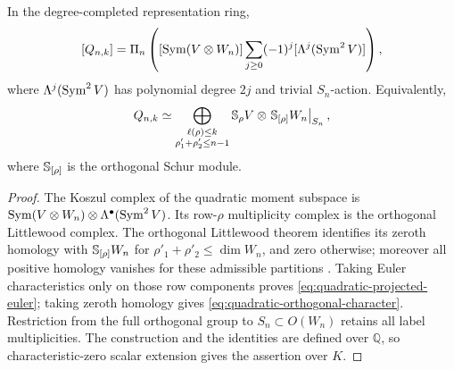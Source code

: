 \begin{theorem}
\label{thm:quadratic-character-all-ranks}
In the degree-completed representation ring,
\begin{equation}\label{eq:quadratic-projected-euler}
 [Q_{n,k}]=\Pi_n\left(
  [\operatorname{Sym}(V\otimes W_n)]
       \sum_{j\geq0}(-1)^j[\Lambda^j(\operatorname{Sym}^2V)]\right),
\end{equation}
where $\Lambda^j(\operatorname{Sym}^2V)$ has polynomial degree $2j$ and trivial
$S_n$-action. Equivalently,
\begin{equation}\label{eq:quadratic-orthogonal-character}
 Q_{n,k}\simeq
 \bigoplus_{\substack{\ell(\rho)\leq k\\
                       \rho'_1+\rho'_2\leq n-1}}
 \mathbb S_\rho V\otimes
       \left.\mathbb S_{[\rho]}W_n\right|_{S_n},
\end{equation}
where $\mathbb S_{[\rho]}$ is the orthogonal Schur module.
\end{theorem}
\begin{proof}
The Koszul complex of the quadratic moment subspace is
$\operatorname{Sym}(V\otimes W_n)\otimes\Lambda^\bullet(\operatorname{Sym}^2V)$.
Its row-$\rho$ multiplicity complex is the orthogonal Littlewood
complex.  The orthogonal Littlewood theorem identifies its
zeroth homology with $\mathbb S_{[\rho]}W_n$ for
$\rho'_1+\rho'_2\leq\dim W_n$, and zero otherwise; moreover all
positive homology vanishes for these admissible partitions
\cite[\S4.2, Proposition~4.1 and Theorem~4.4]{SSW2013}.
Taking Euler characteristics only on those row components proves
\eqref{eq:quadratic-projected-euler}; taking zeroth homology gives
\eqref{eq:quadratic-orthogonal-character}. Restriction from the full
orthogonal group to $S_n\subset O(W_n)$ retains all label
multiplicities. The construction and the identities are defined
over $\mathbb Q$, so characteristic-zero scalar extension gives
the assertion over $K$.
\end{proof}

